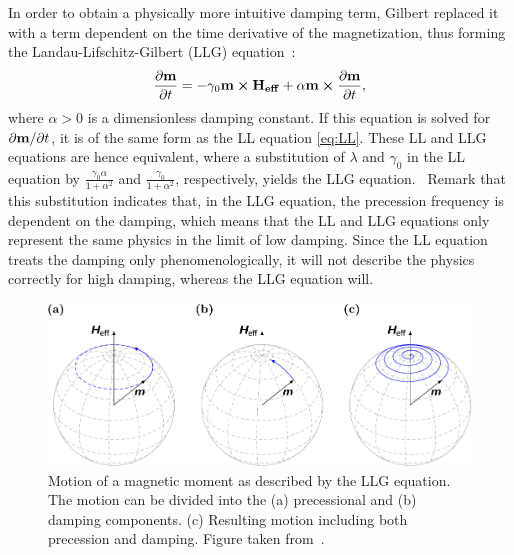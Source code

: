 \documentclass[12pt,a4paper]{article}
\begin{document}
In order to obtain a physically more intuitive damping term, Gilbert \cite{Gilbert1955anomalous} replaced it with a term dependent on the time derivative of the magnetization, thus forming the Landau-Lifschitz-Gilbert (LLG) equation~\cite{ThermFluc_SingleDomain, phd_leliaert, LEL-17b}:
\begin{equation}
	\frac{\partial \vb{m}}{\partial t} = - \gamma_0\vb{m} \cross \vb{H_{eff}} + \alpha \vb{m} \cross \frac{\partial \vb{m}}{\partial t} \mathrm{,}
	\label{eq:LLG}
\end{equation}
where $\alpha>0$ is a dimensionless damping constant. If this equation is solved for $\partial \vb{m}/\partial t$, it is of the same form as the LL equation \eqref{eq:LL}. These LL and LLG equations are hence equivalent, where a substitution of $\lambda$ and $\gamma_0$ in the LL equation by $\frac{\gamma_0 \alpha}{1+\alpha^2}$ and $\frac{\gamma_0}{1+\alpha^2}$, respectively, yields the LLG equation.~\cite{ThermFluc_SingleDomain,phd_leliaert} Remark that this substitution indicates that, in the LLG equation, the precession frequency is dependent on the damping, which means that the LL and LLG equations only represent the same physics in the limit of low damping. Since the LL equation treats the damping only phenomenologically, it will not describe the physics correctly for high damping, whereas the LLG equation will.~\cite{phd_leliaert}

\begin{figure}
    \centering
    \includegraphics[width=0.9\columnwidth]{Figures/Introduction/abert2013discrete - Figure 2.2.pdf}
    \caption{Motion of a magnetic moment as described by the LLG equation. The motion can be divided into the (a) precessional and (b) damping components. (c) Resulting motion including both precession and damping. Figure taken from~\cite{abert2013discrete}.}
    \label{fig:LLG_motion_Heff}
\end{figure}
\end{document}
